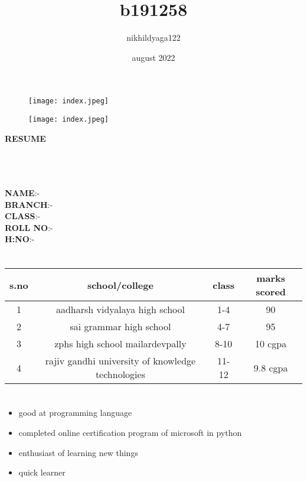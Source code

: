 \documentclass{article}
\begin{document}
\begin{figure}
\texttt{[image: index.jpeg]}
\end{figure}
\title{b191258}
\author{nikhildyaga122 }
\date{august 2022}
\begin{figure}
\texttt{[image: index.jpeg]}
\end{figure}
\maketitle

\begin{huge}
 \textbf{RESUME}
\end{huge}\\


\section{{\color{red}{NAME AND DETAILS}}}
  \textbf{NAME}:-{\color{blue}{Dyaga Nikhil Reddy}}\\
  \textbf{BRANCH}:-{\color{blue}{Computer science and engineering}}\\
  \textbf{CLASS}:-{\color{blue}{121 (C3)}}\\
  \textbf{ROLL NO}:- {\color{blue}{12}}\\
  \textbf{H:NO}:- {\color{blue}{5-4-117,VAMBAY COLONY,RANGA REDDY,TELANGANA,500005}}\\
  
  
\section{{\color{red}{MARKS AND GRADE}}}
\begin{tabular}{|c|c|c|c|}
\hline
s.no & school/college & class & marks scored\\
\hline
 1 & aadharsh vidyalaya high school & 1-4 & 90\\
\hline
 2 & sai grammar high school & 4-7 & 95\\
\hline
 3 & zphs high school mailardevpally & 8-10 & 10 cgpa\\
\hline
 4 & rajiv gandhi university of knowledge technologies & 11-12 & 9.8 cgpa\\
\hline
\end{tabular}



\section{{\color{red}{EXTRA CURRICULAR ACTIVITIES}}}
\begin{itemize}
    \item good at programming language\\
    \item completed online certification program of microsoft in python\\
    \item enthusiast of learning new things\\
    \item quick learner
\end{itemize}
\end{document}
